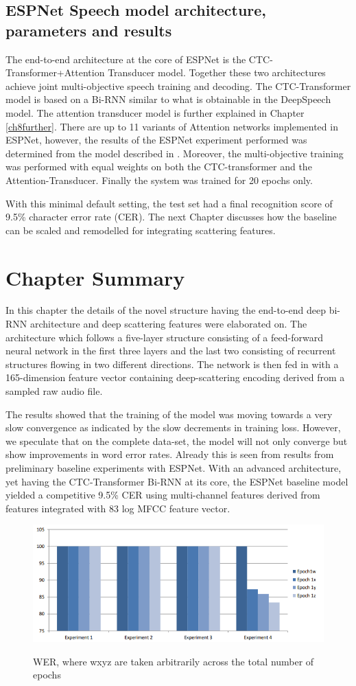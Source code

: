 \subsection{ESPNet Speech model architecture, parameters and results}
The end-to-end architecture at the core of ESPNet is the CTC-Transformer+Attention Transducer model.  Together these two architectures achieve joint multi-objective speech training and decoding.  The CTC-Transformer model is based on a Bi-RNN similar to what is obtainable in the DeepSpeech model.  The attention transducer model is further explained in Chapter \ref{ch8further}.  There are up to 11 variants of Attention networks implemented in ESPNet, however, the results of the ESPNet experiment performed was determined from the model described in \cite{chorowski2015attention}.  Moreover, the multi-objective training was performed with equal weights on both the CTC-transformer and the Attention-Transducer.  Finally the system was trained for 20 epochs only.

With this minimal default setting, the test set had a final recognition score of 9.5\% character error rate (CER).  The next Chapter discusses how the baseline can be scaled and remodelled for integrating scattering features.

\section{Chapter Summary}

In this chapter the details of the novel structure having the end-to-end deep bi-RNN architecture and deep scattering features were elaborated on.  The architecture which follows a five-layer structure consisting of a feed-forward neural network in the first three layers and the last two consisting of recurrent structures flowing in two different directions.  The network is then fed in with a 165-dimension feature vector containing deep-scattering encoding derived from a sampled raw audio file.

The results showed that the training of the model was moving towards a very slow convergence as indicated by the slow decrements in training loss.  However, we speculate that on the complete data-set, the model will not only converge but show improvements in word error rates.  Already this is seen from results from preliminary baseline experiments with ESPNet.   With an advanced architecture, yet having the CTC-Transformer Bi-RNN at its core, the ESPNet baseline model yielded a competitive 9.5\% CER using multi-channel features derived from features integrated with 83 log MFCC feature vector.

\begin{figure}
\centering
  \includegraphics[width=14cm]{thesis/images/res01.PNG}\\
  \caption{WER, where w\<x\<y\<z are taken arbitrarily across the total
number of epochs} \label{fig_6_3_wer}
\end{figure}
